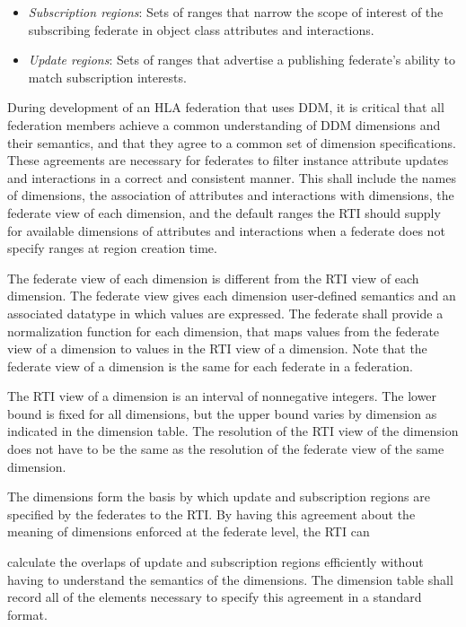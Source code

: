 \begin{itemize}[topsep=1pt,itemsep=2pt]
\item \textit{Subscription regions}: Sets of ranges that narrow the scope of interest of the subscribing federate in object class attributes and interactions.
\item \textit{Update regions}: Sets of ranges that advertise a publishing federate's ability to match subscription interests.
\end{itemize}

During development of an HLA federation that uses DDM, it is critical that all federation members achieve a common understanding of DDM dimensions and their semantics, and that they agree to a common set of dimension specifications. These agreements are necessary for federates to filter instance attribute updates and interactions in a correct and consistent manner. This shall include the names of dimensions, the association of attributes and interactions with dimensions, the federate view of each dimension, and the default ranges the RTI should supply for available dimensions of attributes and interactions when a federate does not specify ranges at region creation time.

The federate view of each dimension is different from the RTI view of each dimension. The federate view gives each dimension user-defined semantics and an associated datatype in which values are expressed. The federate shall provide a normalization function for each dimension, that maps values from the federate view of a dimension to values in the RTI view of a dimension. Note that the federate view of a dimension is the same for each federate in a federation.

The RTI view of a dimension is an interval of nonnegative integers. The lower bound is fixed for all dimensions, but the upper bound varies by dimension as indicated in the dimension table. The resolution of the RTI view of the dimension does not have to be the same as the resolution of the federate view of the same dimension.

The dimensions form the basis by which update and subscription regions are specified by the federates to the RTI. By having this agreement about the meaning of dimensions enforced at the federate level, the RTI can

\newpage
calculate the overlaps of update and subscription regions efficiently without having to understand the semantics of the dimensions. The dimension table shall record all of the elements necessary to specify this agreement in a standard format.


